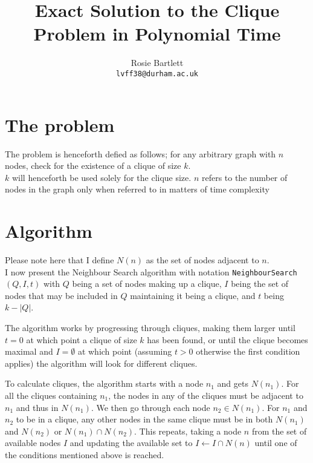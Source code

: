 \documentclass[11pt]{article}
\author{Rosie Bartlett\\\texttt{lvff38@durham.ac.uk}}
\title{Exact Solution to the Clique Problem in Polynomial Time}
\begin{document}
\maketitle


\section{The problem}
The problem is henceforth defied as follows; for any arbitrary graph with $n$ nodes, check for the existence of a clique of size $k$.\\

$k$ will henceforth be used solely for the clique size. $n$ refers to the number of nodes in the graph only when referred to in matters of time complexity

\section{Algorithm}

Please note here that I define $N(n)$ as the set of nodes adjacent to $n$.\\

I now present the Neighbour Search algorithm with notation \texttt{NeighbourSearch}$(Q, I, t)$ with $Q$ being a set of nodes making up a clique, $I$ being the set of nodes that may be included in $Q$ maintaining it being a clique, and $t$ being $k-|Q|$.

The algorithm works by progressing through cliques, making them larger until $t=0$ at which point a clique of size $k$ has been found, or until the clique becomes maximal and $I=\emptyset$ at which point (assuming $t>0$ otherwise the first condition applies) the algorithm will look for different cliques.

To calculate cliques, the algorithm starts with a node $n_1$ and gets $N(n_1)$. For all the cliques containing $n_1$, the nodes in any of the cliques must be adjacent to $n_1$ and thus in $N(n_1)$. We then go through each node $n_2\in N(n_1)$. For $n_1$ and $n_2$ to be in a clique, any other nodes in the same clique must be in both $N(n_1)$ and $N(n_2)$ or $N(n_1)\cap N(n_2)$. This repeats, taking a node $n$ from the set of available nodes $I$ and updating the available set to $I\gets I\cap N(n)$ until one of the conditions mentioned above is reached.
\end{document}
